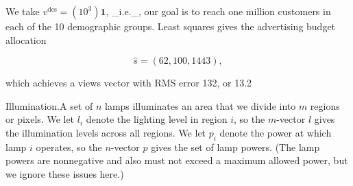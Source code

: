 We take \(v^{\text{des}}=(10^{3})\mathbf{1}\), _i.e._, our goal is to reach one million customers in each of the 10 demographic groups. Least squares gives the advertising budget allocation

\[\hat{s}=(62,100,1443),\]

which achieves a views vector with RMS error 132, or 13.2%

Illumination.A set of \(n\) lamps illuminates an area that we divide into \(m\) regions or pixels. We let \(l_{i}\) denote the lighting level in region \(i\), so the \(m\)-vector \(l\) gives the illumination levels across all regions. We let \(p_{i}\) denote the power at which lamp \(i\) operates, so the \(n\)-vector \(p\) gives the set of lamp powers. (The lamp powers are nonnegative and also must not exceed a maximum allowed power, but we ignore these issues here.)